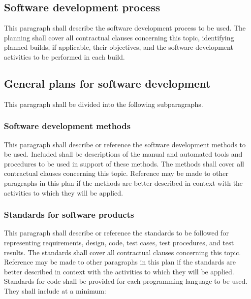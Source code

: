 \documentclass{fidata-report-template}
\begin{document}
\subsection{Software development process}

This paragraph shall describe the software development process to be
used. The planning shall cover all contractual clauses concerning this
topic, identifying planned builds, if applicable, their objectives, and
the software development activities to be performed in each build.

\subsection{General plans for software development}

This paragraph shall be divided into the following subparagraphs.

\subsubsection{Software development methods}

This paragraph shall describe or reference the software development
methods to be used. Included shall be descriptions of the manual and
automated tools and procedures to be used in support of these methods.
The methods shall cover all contractual clauses concerning this topic.
Reference may be made to other paragraphs in this plan if the methods
are better described in context with the activities to which they will
be applied.

\subsubsection{Standards for software products}

This paragraph shall describe or reference the standards to be followed
for representing requirements, design, code, test cases, test
procedures, and test results. The standards shall cover all contractual
clauses concerning this topic. Reference may be made to other paragraphs
in this plan if the standards are better described in context with the
activities to which they will be applied. Standards for code shall be
provided for each programming language to be used. They shall include at
a minimum:
\end{document}
